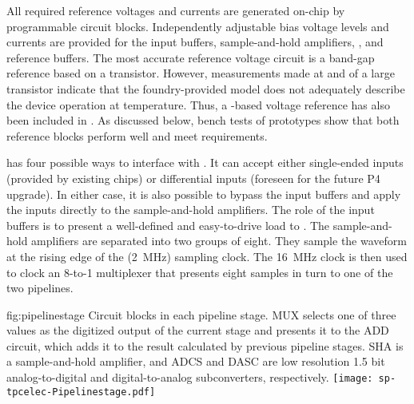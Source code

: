 All required reference voltages and currents are generated on-chip by programmable
circuit blocks. Independently adjustable bias voltage levels and currents are provided for the
input buffers, sample-and-hold amplifiers, , and 
reference buffers.
The most accurate reference voltage circuit is a band-gap reference
based on a  transistor.  However, measurements made at  and
 of a large  transistor indicate that the foundry-provided  model
does not adequately describe the device operation at \lar temperature.  Thus,
a -based voltage reference has also been included in .
As discussed below, bench tests of  prototypes show that both reference blocks 
perform well and meet requirements.

 has four possible ways to interface with .  It
can accept either single-ended inputs (provided by existing 
chips) or differential inputs (foreseen for the future  P4 upgrade).
In either case, it is also possible to bypass the input buffers and apply the inputs directly
to the sample-and-hold amplifiers. The role of the input buffers is to present a well-defined
and easy-to-drive load to .  The sample-and-hold amplifiers are separated
into two groups of eight. They sample the waveform at the rising edge of the
(\SI{2}{MHz}) sampling clock. The \SI{16}{MHz} clock is then
used to clock an \num{8}-to-\num{1} multiplexer that presents eight samples in 
turn to one of the two  pipelines.

\begin{dunefigure}
{fig:pipelinestage}
{Circuit blocks in each  pipeline stage. MUX selects one of three values
as the digitized output of the current stage and presents it to the ADD circuit, which 
adds it to the result calculated by previous pipeline stages.
SHA is a sample-and-hold amplifier, and
ADCS and DASC are low resolution 1.5 bit analog-to-digital and digital-to-analog 
subconverters, respectively.}
\texttt{[image: sp-tpcelec-Pipelinestage.pdf]}
\end{dunefigure}

